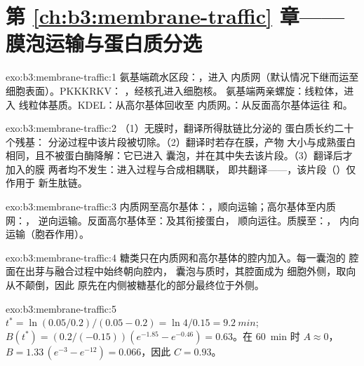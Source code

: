 \section*{第 \ref{ch:b3:membrane-traffic} 章——膜泡运输与蛋白质分选}

\begin{solution}{exo:b3:membrane-traffic:1}
氨基端疏水区段：，进入
内质网（默认情况下继而运至细胞表面）。PKKKRKV：
，经核孔进入细胞核。
氨基端两亲螺旋：线粒体，进入
线粒体基质。KDEL：从高尔基体回收至
内质网。：从反面高尔基体运往
和。
\end{solution}

\begin{solution}{exo:b3:membrane-traffic:2}
（1）无膜时，翻译所得肽链比分泌的
蛋白质长约二十个残基：
分泌过程中该片段被切除。（2）翻译时若存在膜，产物
大小与成熟蛋白相同，且不被蛋白酶降解：它已进入
囊泡，并在其中失去该片段。（3）翻译后才加入的膜
两者均不发生：进入过程与合成相耦联，
即共翻译——，该片段（）仅作用于
新生肽链。
\end{solution}

\begin{solution}{exo:b3:membrane-traffic:3}
内质网至高尔基体：，顺向运输；高尔基体至内质网：，
逆向运输。反面高尔基体至：及其衔接蛋白，
顺向运往。质膜至：，
内向运输（胞吞作用）。
\end{solution}

\begin{solution}{exo:b3:membrane-traffic:4}
糖类只在内质网和高尔基体的腔内加入。每一囊泡的
腔面在出芽与融合过程中始终朝向腔内，
囊泡与质时，其腔面成为
细胞外侧，取向从不颠倒，因此
原先在内侧被糖基化的部分最终位于外侧。
\end{solution}

\begin{solution}{exo:b3:membrane-traffic:5}
$t^{*} = \ln(0.05/0.2)/(0.05 - 0.2) = \ln 4/0.15 = \qty{9.2}{min}$;
$B(t^{*}) = (0.2/(-0.15))(e^{-1.85} - e^{-0.46}) = 0.63$。在 \qty{60}{min} 时
$A \approx 0$，$B = 1.33\,(e^{-3} - e^{-12}) = 0.066$，因此 $C = 0.93$。
\end{solution}

